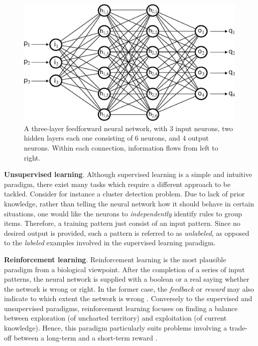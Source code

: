 \documentclass[12pt, a4paper, twoside, openright]{report}
\numberwithin{equation}{chapter}
\theoremstyle{theorem}
\theoremstyle{definition}
\theoremstyle{remark}
\theoremstyle{proposition}
\numberwithin{figure}{chapter}
\begin{document}
		\begin{figure}[t]
			\center
			\includegraphics[scale = 0.6]{neural_network_bis.eps}
			
			\caption{A three-layer feedforward neural network, with $3$ input neurons, two hidden layers each one consisting of $6$ neurons, and $4$ output neurons. Within each connection, information flows from left to right.}
			\label{fig:neural-network}
		\end{figure}
		
		\noindent \textbf{Unsupervised learning}. Although supervised learning is a simple and intuitive paradigm, there exist many tasks which require a different approach to be tackled. Consider for instance a cluster detection problem. Due to lack of prior knowledge, rather than telling the neural network how it should behave in certain situations, one would like the neurons to \emph{independently} identify rules to group items. Therefore, a training pattern just consist of an input pattern. Since no desired output is provided, such a pattern is referred to as \emph{unlabeled}, as opposed to the \emph{labeled} examples involved in the supervised learning paradigm.
		
		\vspace*{0.3cm}
		
		\noindent \textbf{Reinforcement learning}. Reinforcement learning is the most plausible paradigm from a biological viewpoint. After the completion of a series of input patterns, the neural network is supplied with a boolean or a real saying whether the network is wrong or right. In the former case, the \emph{feedback} or \emph{reward} may also indicate to which extent the network is wrong \cite{Kri}. Conversely to the supervised and unsupervised paradigms, reinforcement learning focuses on finding a balance between exploration (of uncharted territory) and exploitation (of current knowledge). Hence, this paradigm particularly suits problems involving a trade-off between a long-term and a short-term reward \cite{KLM96}.
		
\end{document}
